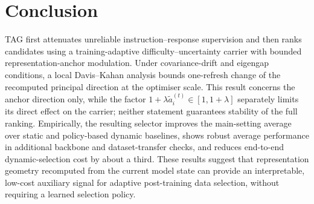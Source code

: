 \section{Conclusion}
\label{sec:conclusion}

\textsc{TAG} first attenuates unreliable instruction--response
supervision and then ranks candidates using a training-adaptive
difficulty--uncertainty carrier with bounded representation-anchor
modulation. Under covariance-drift and eigengap conditions, a local
Davis--Kahan analysis bounds one-refresh change of the recomputed
principal direction at the optimiser scale. This result concerns the
anchor direction only, while the factor
\(1+\lambda\widetilde a_i^{(t)}\in[1,1{+}\lambda]\) separately
limits its direct effect on the carrier; neither statement guarantees
stability of the full ranking. Empirically, the resulting selector improves the
main-setting average over static and policy-based dynamic baselines,
shows robust average performance in additional backbone and
dataset-transfer checks, and reduces end-to-end dynamic-selection cost
by about a third. These results suggest that representation geometry
recomputed from the current model state can provide an interpretable,
low-cost auxiliary signal for adaptive post-training data selection,
without requiring a learned selection policy.

